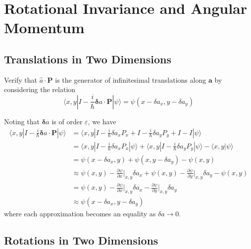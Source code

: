 \documentclass[../principles-of-quantum-mechanics.tex]{subfiles}
\begin{document}
	\printanswers
	
	\setcounter{section}{11}
	\section{Rotational Invariance and Angular Momentum}
	
	\begin{questions}
	\setcounter{subsection}{0}
	\subsection{Translations in Two Dimensions}
	
	\question Verify that $\hat{a}\cdot\mathbf{P}$ is the generator of infinitesimal translations along $\mathbf{a}$ by considering the relation
	$$\langle x, y|I - \frac{i}{\hbar}\boldsymbol{\delta}a\cdot\mathbf{P}|\psi\rangle = \psi(x - \delta a_x, y - \delta a_y)$$
	
	\begin{solution}
		Noting that $\boldsymbol{\delta}a$ is of order $\varepsilon$, we have
		\begin{align*}
			\langle x, y|I - \frac{i}{\hbar}\boldsymbol{\delta}a\cdot\mathbf{P}|\psi\rangle &= \langle x, y|I - \frac{i}{\hbar}\delta a_x P_x + I - \frac{i}{\hbar}\delta a_y P_y + I - I|\psi\rangle \\
			&= \langle x, y|I - \frac{i}{\hbar}\delta a_xP_x|\psi\rangle + \langle x, y|I - \frac{i}{\hbar}\delta a_yP_y|\psi\rangle - \langle x, y|\psi\rangle \\
			&= \psi(x - \delta a_x, y) + \psi(x, y - \delta a_y) - \psi(x, y) \\
			&\approx \psi(x, y) - \frac{\partial \psi}{\partial x}\Big|_{x, y}\delta a_x + \psi(x ,y) - \frac{\partial \psi}{\partial y}\Big|_{x,y}\delta a_y - \psi(x, y) \\
			&= \psi(x, y) - \frac{\partial \psi}{\partial x}\Big|_{x, y}\delta a_x - \frac{\partial \psi}{\partial y}\Big|_{x,y}\delta a_y \\
			&\approx \psi(x - \delta a_x, y - \delta a_y)
		\end{align*}
		where each approximation becomes an equality as ${\delta a\to 0}$.
	\end{solution}

	\setcounter{subsection}{1}
	\setcounter{question}{0}
	\subsection{Rotations in Two Dimensions}
	

\end{questions}
\end{document}
